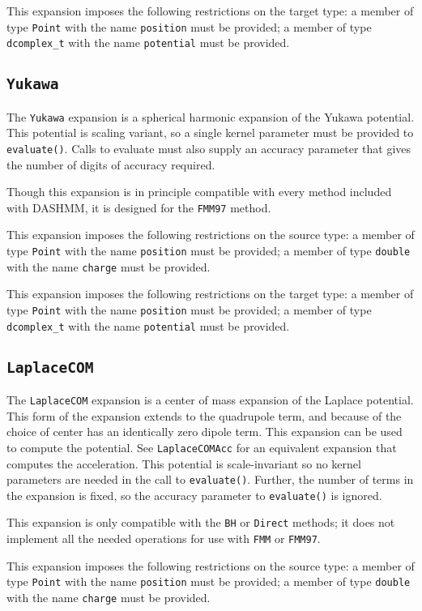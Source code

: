 This expansion imposes the following restrictions on the target type: a
member of type {\tt Point} with the name {\tt position} must be provided;
a member of type {\tt dcomplex\_t} with the name {\tt potential}
 must be provided.

\subsection{{\tt Yukawa}}

The {\tt Yukawa} expansion is a spherical harmonic expansion of the Yukawa
potential. This potential is scaling variant, so a single kernel parameter
must be provided to {\tt evaluate()}. Calls to evaluate must also supply an
accuracy parameter that gives the number of digits of accuracy required.

Though this expansion is in principle compatible with every method included
with DASHMM, it is designed for the {\tt FMM97} method.

This expansion imposes the following restrictions on the source type: a
member of type {\tt Point} with the name {\tt position} must be provided;
a member of
type {\tt double} with the name {\tt charge} must be provided.

This expansion imposes the following restrictions on the target type: a
member of type {\tt Point} with the name {\tt position} must be provided;
a member of type {\tt dcomplex\_t} with the name {\tt potential}
 must be provided.

\subsection{{\tt LaplaceCOM}}

The {\tt LaplaceCOM} expansion is a center of mass expansion of the Laplace
potential. This form of the expansion extends to the quadrupole term, and
because of the choice of center has an identically zero dipole term. This
expansion can be used to compute the potential. See {\tt LaplaceCOMAcc} for an
equivalent expansion that computes the acceleration. This potential is
scale-invariant so no kernel parameters are needed in the call to
{\tt evaluate()}.
Further, the number of terms in the expansion is fixed, so the accuracy
parameter to {\tt evaluate()} is ignored.

This expansion is only compatible with the {\tt BH} or {\tt Direct} methods;
it does
not implement all the needed operations for use with {\tt FMM} or {\tt FMM97}.

This expansion imposes the following restrictions on the source type: a
member of type {\tt Point}
with the name {\tt position} must be provided; a member of
type {\tt double} with the name {\tt charge} must be provided.

